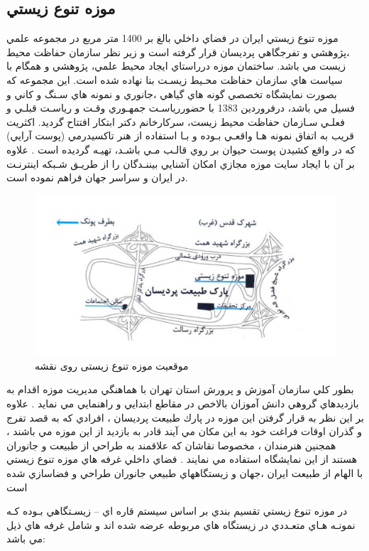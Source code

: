 \subsection{موزه تنوع زيستي}
موزه تنوع زيستي ايران در فضاي داخلي بالغ بر 1400 متر مربع در مجموعه علمي ،پژوهشي و تفرجگاهي
پرديسان قرار گرفته است و زير نظر سازمان حفاظت محيط زيست مي باشد. 
ساختمان موزه درراستاي ايجاد محيط علمي، پژوهشي و همگام با سياست هاي سازمان حفاظت محـيط زيسـت
بنا نهاده شده است. اين مجموعه كه بصورت نمايشگاه تخصصي گونه هاي گياهي ،جانوري و نمونه هاي سـنگ و
كاني و فسيل مي باشد، درفروردين 1383 با حضوررياسـت جمهـوري وقـت و رياسـت قبلـي و فعلـي سـازمان
حفاظت محيط زيست، سركارخانم دكتر ابتكار افتتاح گرديد. اكثريت قريب به اتفاق نمونه هـا واقعـي بـوده و بـا
استفاده از هنر تاكسيدرمي (پوست آرايي) كه در واقع كشيدن پوست حيوان بر روي قالـب مـي باشـد، تهيـه
گرديده است . علاوه بر آن با ايجاد سايت موزه مجازي امكان آشنايي بيننـدگان را از طريـق شـبكه اينترنـت در
ايران و سراسر جهان فراهم نموده است.

\begin{figure}
    \label{fig2.1}
    \centering
    \includegraphics[scale = 0.5]{images/map.PNG}
    \caption{موقعیت موزه تنوع زیستی روی نقشه}
\end{figure}

بطور كلي سازمان آموزش و پرورش استان تهران با هماهنگي مديريت موزه اقدام به بازديدهاي گروهي دانش
آموزان بالاخص در مقاطع ابتدايي و راهنمايي مي نمايد . علاوه بر اين نظر به قرار گرفتن اين موزه در پارك
طبيعت پرديسان ، افرادي كه به قصد تفرج و گذران اوقات فراغت خود به اين مكان مي آيند قادر به بازديد از
اين موزه مي باشند ، همجنين هنرمندان ، مخصوصا نقاشان كه علاقمند به طراحي از طبيعت و جانوران
هستند از اين نمايشگاه استفاده مي نمايند . فضاي داخلي غرفه هاي موزه تنوع زيستي با الهام از طبيعت ايران
،جهان و زيستگاههاي طبيعي جانوران طراحي و فضاسازي شده است

در موزه تنوع زيستي تقسيم بندي بر اساس سيستم قاره اي – زيسـتگاهي بـوده كـه نمونـه هـاي متعـددي در
زيستگاه هاي مربوطه عرضه شده اند و شامل غرفه هاي ذيل مي باشد:

